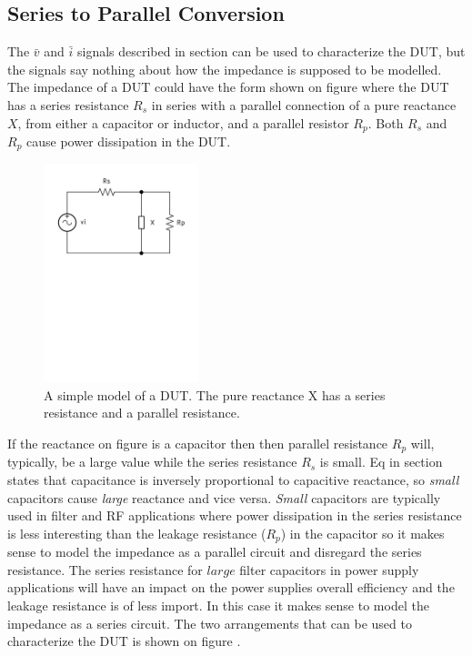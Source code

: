 \subsection{Series to Parallel Conversion} \label{subsec:SeriesToParallel}
The $\bar v$ and $\bar i$ signals described in section  can be used to characterize the DUT, but the signals say nothing about how the impedance is supposed to be modelled. The impedance of a DUT could have the form shown on figure  where the DUT has a series resistance $R_s$ in series with a parallel connection of a pure reactance $X$, from either a capacitor or inductor, and a parallel resistor $R_p$. Both $R_s$ and $R_p$ cause power dissipation in the DUT.

\begin{figure}[H]
    \centering
    \includegraphics[clip, trim=0 450 0 0, width=0.4\textwidth]{Sections/4_TechnicalAnalysis/Figures/4_1_1_DUTXSeriesParallel.pdf}
    \caption{A simple model of a DUT. The pure reactance X has a series resistance and a parallel resistance.}
    \label{fig:4_1_5_DUTXSeriesParallel}
\end{figure}

If the reactance on figure  is a capacitor then then parallel resistance $R_p$ will, typically, be a large value while the series resistance $R_s$ is small. Eq  in section  states that capacitance is inversely proportional to capacitive reactance, so \textit{small} capacitors cause \textit{large} reactance and vice versa. \textit{Small} capacitors are typically used in filter and RF applications where power dissipation in the series resistance is less interesting than the leakage resistance ($R_p$) in the capacitor so it makes sense to model the impedance as a parallel circuit and disregard the series resistance. The series resistance for $large$ filter capacitors in power supply applications will have an impact on the power supplies overall efficiency and the leakage resistance is of less import. In this case it makes sense to model the impedance as a series circuit. The two arrangements that can be used to characterize the DUT is shown on figure .

